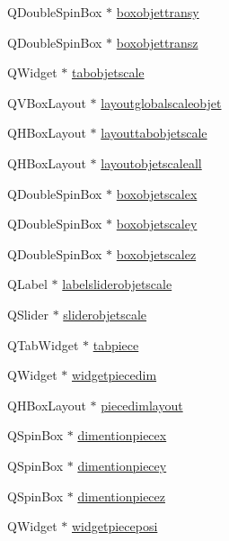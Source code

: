 \begin{DoxyCompactItemize}
\item 
Q\+Double\+Spin\+Box $\ast$ \hyperlink{class_mondock_a15ed0b5c13500bfad6a2b5289c5a3ddf}{boxobjettransy}
\item 
Q\+Double\+Spin\+Box $\ast$ \hyperlink{class_mondock_ab0102fb06cf68a8c70fed13550b4dcb6}{boxobjettransz}
\item 
Q\+Widget $\ast$ \hyperlink{class_mondock_a2463c02b8f4ff3f1ff23f2f72e3c0f48}{tabobjetscale}
\item 
Q\+V\+Box\+Layout $\ast$ \hyperlink{class_mondock_a376d034b08d180ee9d91ab0c5826a5d8}{layoutglobalscaleobjet}
\item 
Q\+H\+Box\+Layout $\ast$ \hyperlink{class_mondock_a7337ba165d8f7543e3469a2a25f3f062}{layouttabobjetscale}
\item 
Q\+H\+Box\+Layout $\ast$ \hyperlink{class_mondock_a4adea363f864aeaa15cbf636dca8f4cc}{layoutobjetscaleall}
\item 
Q\+Double\+Spin\+Box $\ast$ \hyperlink{class_mondock_a0300855d7d2e07ff9f29acfe6aabf86a}{boxobjetscalex}
\item 
Q\+Double\+Spin\+Box $\ast$ \hyperlink{class_mondock_a111e6d0603d220eafef5fe6754ee5686}{boxobjetscaley}
\item 
Q\+Double\+Spin\+Box $\ast$ \hyperlink{class_mondock_a23022e2424b108b94b9519167b702b2a}{boxobjetscalez}
\item 
Q\+Label $\ast$ \hyperlink{class_mondock_a1536ab110ce2aff8fc022ccf80ee0cff}{labelsliderobjetscale}
\item 
Q\+Slider $\ast$ \hyperlink{class_mondock_a46bd66f14e79aed16f26a9475640fcbd}{sliderobjetscale}
\item 
Q\+Tab\+Widget $\ast$ \hyperlink{class_mondock_a5985ccaca36a0e545e6e74a84623b1a9}{tabpiece}
\item 
Q\+Widget $\ast$ \hyperlink{class_mondock_abe21ad30be63590c6ce6e18969e9f082}{widgetpiecedim}
\item 
Q\+H\+Box\+Layout $\ast$ \hyperlink{class_mondock_af9d31eb2800c5608dc9da41dcf1ca1d0}{piecedimlayout}
\item 
Q\+Spin\+Box $\ast$ \hyperlink{class_mondock_ab3829ab678beb2bc391bdb325b0beda1}{dimentionpiecex}
\item 
Q\+Spin\+Box $\ast$ \hyperlink{class_mondock_a60c16f4209470967b672f33a2c4fe67c}{dimentionpiecey}
\item 
Q\+Spin\+Box $\ast$ \hyperlink{class_mondock_ab9605a7a3ee01aec5f5b29fc111abdeb}{dimentionpiecez}
\item 
Q\+Widget $\ast$ \hyperlink{class_mondock_a960802e2aa94a22487ff03bbaa102a02}{widgetpieceposi}

\end{DoxyCompactItemize}
